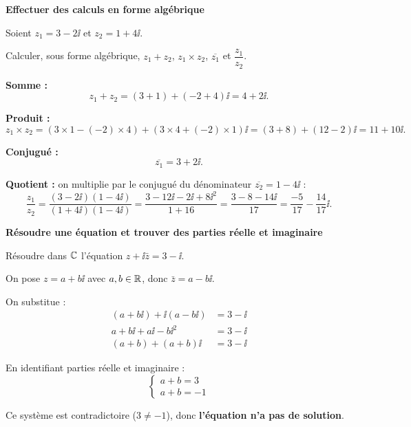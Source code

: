 \exerciceresolu
\textbf{Effectuer des calculs en forme algébrique}

Soient $z_1 = 3 - 2\ii$ et $z_2 = 1 + 4\ii$.

Calculer, sous forme algébrique, $z_1 + z_2$, $z_1 \times z_2$, $\overline{z_1}$
et $\dfrac{z_1}{z_2}$.

\solution

\textbf{Somme :}
$$
z_1 + z_2 = (3+1) + (-2+4)\ii = 4 + 2\ii.
$$

\textbf{Produit :}
$$
z_1 \times z_2 = (3 \times 1 - (-2) \times 4) + (3 \times 4 + (-2) \times 1)\ii
= (3 + 8) + (12 - 2)\ii = 11 + 10\ii.
$$

\textbf{Conjugué :}
$$
\overline{z_1} = 3 + 2\ii.
$$

\textbf{Quotient :} on multiplie par le conjugué du dénominateur $\overline{z_2} = 1 - 4\ii$ :
$$
\frac{z_1}{z_2}
= \frac{(3 - 2\ii)(1 - 4\ii)}{(1 + 4\ii)(1 - 4\ii)}
= \frac{3 - 12\ii - 2\ii + 8\ii^2}{1 + 16}
= \frac{3 - 8 - 14\ii}{17}
= \frac{-5}{17} - \frac{14}{17}\ii.
$$



\exerciceresolu
\textbf{Résoudre une équation et trouver des parties réelle et imaginaire}

Résoudre dans $\mathbb{C}$ l'équation $z + \ii\bar{z} = 3 - \ii$.

\solution

On pose $z = a + b\ii$ avec $a, b \in \mathbb{R}$, donc $\bar{z} = a - b\ii$.

On substitue :
$$
\begin{aligned}
	(a + b\ii) + \ii(a - b\ii) &= 3 - \ii\\
	a + b\ii + a\ii - b\ii^2   &= 3 - \ii\\
	(a + b) + (a + b)\ii       &= 3 - \ii
\end{aligned}
$$

En identifiant parties réelle et imaginaire :
$$
\begin{cases}
	a + b = 3 \\
	a + b = -1
\end{cases}
$$

Ce système est contradictoire ($3 \neq -1$), donc \textbf{l'équation n'a pas de solution}.



